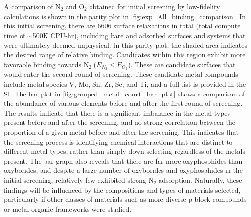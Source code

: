 A comparison of N$_2$ and O$_2$ obtained for initial screening by low-fidelity calculations is shown in the parity plot in \ref{fig:exp_All_binding_comparison}.  In this initial screening, there are 6606 surface relaxations in total (total compute time of $\sim$500K CPU-hr), including bare and adsorbed surfaces and systems that were ultimately deemed unphysical. In this parity plot, the shaded area indicates the desired range of relative binding. Candidates within this region exhibit more favorable binding towards N$_2$ ($E_{N_2} \le E_{O_2}$). These are candidate surfaces that would enter the second round of screening. These candidate metal compounds include metal species V, Mo, Sn, Zr, Sc, and Ti, and a full list is provided in the SI. The bar plot in \ref{fig:grouped_metal_count_bar_plot} shows a comparison of the abundance of various elements before and after the first round of screening. The results indicate that there is a significant imbalance in the metal types present before and after the screening, and no strong correlation between the proportion of a given metal before and after the screening. This indicates that the screening process is identifying chemical interactions that are distinct to different metal types, rather than simply down-selecting regardless of the metals present. The bar graph also reveals that there are far more oxyphosphides than oxyborides, and despite a large number of oxyborides and oxyphosphides in the initial screening, relatively few exhibited strong N$_2$ adsorption. Naturally, these findings will be influenced by the compositions and types of materials selected, particularly if other classes of materials such as more diverse p-block compounds or metal-organic frameworks were studied.

